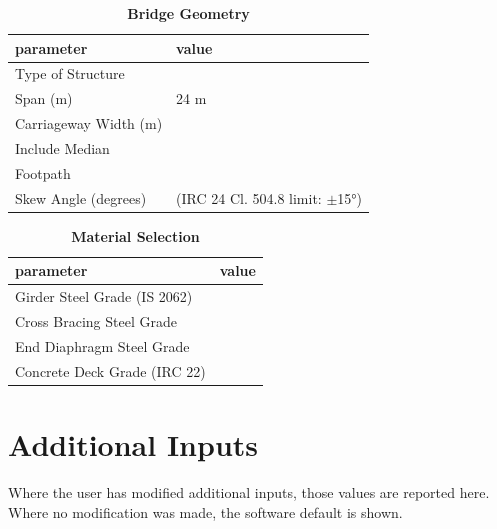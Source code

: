 \documentclass[12pt,a4paper]{report}
\numberwithin{table}{chapter}
\numberwithin{figure}{chapter}
\begin{document}
\begin{table}[H]
\caption{\textbf{Bridge Geometry}}
\label{subsec:bridge-geometry}
\begin{tabular}{|L{5.5cm}|L{8.5cm}|}
\hline
\textbf{parameter} & \textbf{value} \\
\hline
\textnormal{Type of Structure} &  \\
\hline
\textnormal{Span (m)} & 24 m \\
\hline
\textnormal{Carriageway Width (m)} &  \\
\hline
\textnormal{Include Median} &  \\
\hline
\textnormal{Footpath} &  \\
\hline
\textnormal{Skew Angle (degrees)} &  (IRC 24 Cl. 504.8 limit: $\pm$15°) \\
\hline
\end{tabular}
\end{table}
\vspace{0.4cm}

\begin{table}[H]
\caption{\textbf{Material Selection}}
\label{subsec:material}
\begin{tabular}{|L{5.5cm}|L{8.5cm}|}
\hline
\textbf{parameter} & \textbf{value} \\
\hline
\textnormal{Girder Steel Grade (IS 2062)} &  \\
\hline
\textnormal{Cross Bracing Steel Grade} &  \\
\hline
\textnormal{End Diaphragm Steel Grade} &  \\
\hline
\textnormal{Concrete Deck Grade (IRC 22)} &  \\
\hline
\end{tabular}
\end{table}
\vspace{0.4cm}

\newpage
\section{Additional Inputs}
\label{sec:additional-inputs}

Where the user has modified additional inputs, those values are reported here. Where no modification was made, the software default is shown.

\vspace{0.8cm}
\end{document}
